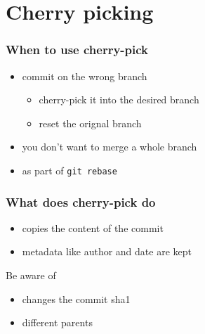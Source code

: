\section{Cherry picking}
\begin{frame}
    \frametitle{When to use cherry-pick}
    \begin{itemize}
        \item commit on the wrong branch
        \begin{itemize}
            \item cherry-pick it into the desired branch
            \item reset the orignal branch
        \end{itemize}
        \item you don't want to merge a whole branch
        \item as part of \texttt{git rebase}
    \end{itemize}
\end{frame}

\begin{frame}
    \frametitle{What does cherry-pick do}
    \begin{itemize}
        \item copies the content of the commit
        \item metadata like author and date are kept
    \end{itemize}
    \begin{alertblock}{Be aware of}
        \begin{itemize}
            \item changes the commit sha1
            \item different parents
        \end{itemize}
    \end{alertblock}
\end{frame}

